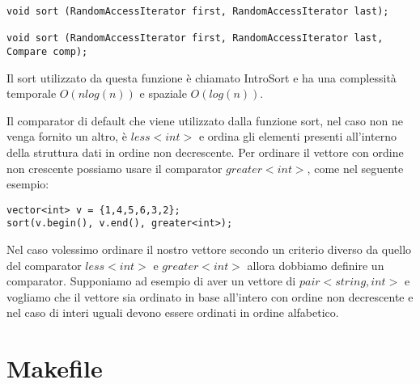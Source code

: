 \documentclass{article}
\begin{document}
\begin{lstlisting}
void sort (RandomAccessIterator first, RandomAccessIterator last);

void sort (RandomAccessIterator first, RandomAccessIterator last, Compare comp);
\end{lstlisting}

Il sort utilizzato da questa funzione è chiamato IntroSort e ha una complessità temporale $O(nlog(n))$ e spaziale $O(log(n))$.

Il comparator di default che viene utilizzato dalla funzione sort, nel caso non ne venga fornito un altro, è $less<int>$ e ordina gli elementi presenti all'interno della struttura dati in ordine non decrescente. Per ordinare il vettore con ordine non crescente possiamo usare il comparator $greater<int>$, come nel seguente esempio:

\begin{lstlisting}
vector<int> v = {1,4,5,6,3,2};
sort(v.begin(), v.end(), greater<int>);
\end{lstlisting}

Nel caso volessimo ordinare il nostro vettore secondo un criterio diverso da quello del comparator $less<int>$ e $greater<int>$ allora dobbiamo definire un comparator. Supponiamo ad esempio di aver un vettore di $pair<string, int>$ e vogliamo che il vettore sia ordinato in base all'intero con ordine non decrescente e nel caso di interi uguali devono essere ordinati in ordine alfabetico.



\section{Makefile}


\end{document}
